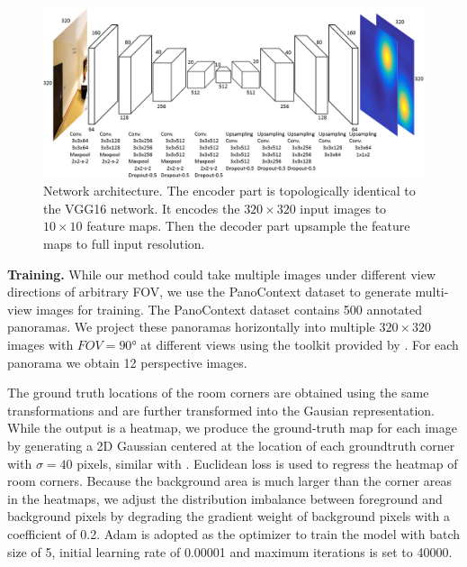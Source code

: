 \begin{figure}
	\centering
	\includegraphics[width=\linewidth]{figs/network.png}
	\caption{Network architecture. The encoder part is topologically identical to the VGG16 network. It encodes the $320 \times 320$ input images to $10 \times 10$ feature maps. Then the decoder part upsample the feature maps to full input resolution. }
	\label{fig:network}
\end{figure}

\noindent\textbf{Training.} 
While our method could take multiple images under different view directions of arbitrary FOV, we use the PanoContext dataset \cite{zhang2014panocontext} to generate multi-view images for training. 
The PanoContext dataset contains 500 annotated panoramas. We project these panoramas horizontally into multiple $320 \times 320$ images with $FOV=\ang{90}$ at different views using the toolkit provided by \cite{zhang2014panocontext}. For each panorama we obtain 12 perspective images.
%

The ground truth locations of the room corners are obtained using the same transformations and are further transformed into the Gausian representation. 
While the output is a heatmap, we produce the ground-truth map for each image by generating a 2D Gaussian centered at the location of each groundtruth corner with $\sigma=40$ pixels, similar with \cite{LeeRoomNet17,tompson2014joint}.
%
Euclidean loss is used to regress the heatmap of room corners. 
Because the background area is much larger than the corner areas in the heatmaps, we adjust the distribution imbalance between foreground and background pixels by degrading the gradient weight of background pixels with a coefficient of 0.2.
Adam is adopted as the optimizer to train the model with batch size of 5, initial learning rate of 0.00001 and maximum iterations is set to 40000.

